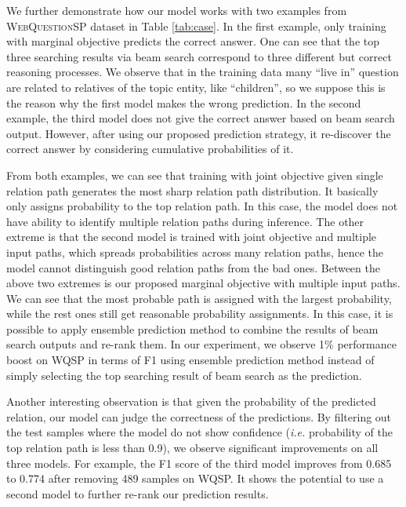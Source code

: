 
We further demonstrate how our model works with two examples from \textsc{WebQuestionSP} dataset in Table \ref{tab:case}. In the first example, only training with marginal objective predicts the correct answer. One can see that the top three searching results via beam search correspond to three different but correct reasoning processes. We observe that in the training data many ``live in'' question are related to relatives of the topic entity, like ``children'', so we suppose this is the reason why the first model makes the wrong prediction. In the second example, the third model does not give the correct answer based on beam search output. However, after using our proposed prediction strategy, it re-discover the correct answer by considering cumulative probabilities of it.

From both examples, we can see that training with joint objective given single relation path generates the most sharp relation path distribution. It basically only assigns probability to the top relation path. In this case, the model does not have ability to identify multiple relation paths during inference. The other extreme is that the second model is trained with joint objective and multiple input paths, which spreads probabilities across many relation paths, hence the model cannot distinguish good relation paths from the bad ones. Between the above two extremes is our proposed marginal objective with multiple input paths. We can see that the most probable path is assigned with the largest probability, while the rest ones still get reasonable probability assignments. In this case, it is possible to apply ensemble prediction method to combine the results of beam search outputs and re-rank them. In our experiment, we observe 1\% performance boost on WQSP in terms of F1 using ensemble prediction method instead of simply selecting the top searching result of beam search as the prediction.

Another interesting observation is that given the probability of the predicted relation, our model can judge the correctness of the predictions. By filtering out the test samples where the model do not show confidence (\emph{i.e.} probability of the top relation path is less than 0.9), we observe significant improvements on all three models. For example, the F1 score of the third model improves from 0.685 to 0.774 after removing 489 samples on WQSP. It shows the potential to use a second model to further re-rank our prediction results.

